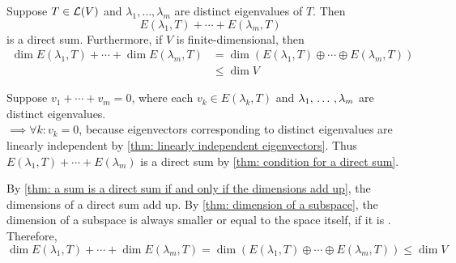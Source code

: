 \setcounter{thm}{53}
\begin{thm} 
  \label{thm: sum of eigenspaces is a direct sum}
  Suppose $T\in \mathcal{L} (V)$ and $\lambda_1, \dots, \lambda_m$ are distinct eigenvalues of $T$. Then
  \begin{equation}
    E(\lambda_1, T) + \cdots + E(\lambda_m, T)
  \end{equation}
  is a direct sum. Furthermore, if $V$ is finite-dimensional, then
  \begin{equation}
    \begin{aligned}
      \dim E(\lambda_1, T) + \cdots + \dim E(\lambda_m, T)
      & = \dim \left( E(\lambda_1, T)  \oplus \cdots \oplus E(\lambda_m, T) \right) \\
      & \leq \dim V
    \end{aligned}
  \end{equation}
\end{thm}
\begin{prf}
  Suppose $v_1 + \cdots + v_m = 0$, where each $v_k \in E(\lambda_k, T)$ and $\lambda_1, {\, \ldots \,\,}, \lambda_m$ are distinct eigenvalues. \\
  $\implies \forall k: v_k = 0$, because eigenvectors corresponding to distinct eigenvalues are linearly independent by \ref{thm: linearly independent eigenvectors}. Thus $E(\lambda_1, T) + \cdots + E(\lambda_m)$ is a direct sum by \ref{thm: condition for a direct sum}.

  By \ref{thm: a sum is a direct sum if and only if the dimensions add up}, the dimensions of a direct sum add up. By \ref{thm: dimension of a subspace}, the dimension of a subspace is always smaller or equal to the space itself, if it is \fd. Therefore,
  $
      \dim E(\lambda_1, T) + \cdots + \dim E(\lambda_m, T)
       = \dim \left( E(\lambda_1, T)  \oplus \cdots \oplus E(\lambda_m, T) \right)
       \leq \dim V
  $
\end{prf}

